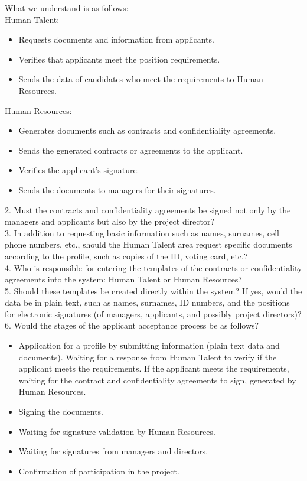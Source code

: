 \documentclass{scrreprt}
\begin{document}
    What we understand is as follows:\\
    Human Talent:
    \begin{itemize}
        \item Requests documents and information from applicants.
        \item Verifies that applicants meet the position requirements.
        \item Sends the data of candidates who meet the requirements to Human Resources.
    \end{itemize}
    Human Resources:
    \begin{itemize}
        \item Generates documents such as contracts and confidentiality agreements.
        \item Sends the generated contracts or agreements to the applicant.
        \item Verifies the applicant's signature.
        \item Sends the documents to managers for their signatures.
    \end{itemize}

2. Must the contracts and confidentiality agreements be signed not only by the managers and applicants but also by the project director?\\

3. In addition to requesting basic information such as names, surnames, cell phone numbers, etc., should the Human Talent area request specific documents according to the profile, such as copies of the ID, voting card, etc.?\\

4. Who is responsible for entering the templates of the contracts or confidentiality agreements into the system: Human Talent or Human Resources?\\

5. Should these templates be created directly within the system? If yes, would the data be in plain text, such as names, surnames, ID numbers, and the positions for electronic signatures (of managers, applicants, and possibly project directors)?\\

6. Would the stages of the applicant acceptance process be as follows?
\begin{itemize}
    \item Application for a profile by submitting information (plain text data and documents).
    Waiting for a response from Human Talent to verify if the applicant meets the requirements.
    If the applicant meets the requirements, waiting for the contract and confidentiality agreements to sign, generated by Human Resources.
    \item Signing the documents.
    \item  Waiting for signature validation by Human Resources.
    \item  Waiting for signatures from managers and directors.
    \item Confirmation of participation in the project.
\end{itemize}
\end{document}
